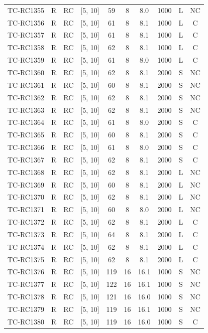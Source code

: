 \begin{longtable}{lccccccccc}
TC-RC1355 & R & RC & [5, 10] & 59 & 8 & 8.0 & 1000 & L & NC \\
TC-RC1356 & R & RC & [5, 10] & 61 & 8 & 8.1 & 1000 & L & C \\
TC-RC1357 & R & RC & [5, 10] & 61 & 8 & 8.1 & 1000 & L & C \\
TC-RC1358 & R & RC & [5, 10] & 62 & 8 & 8.1 & 1000 & L & C \\
TC-RC1359 & R & RC & [5, 10] & 61 & 8 & 8.0 & 1000 & L & C \\
TC-RC1360 & R & RC & [5, 10] & 62 & 8 & 8.1 & 2000 & S & NC \\
TC-RC1361 & R & RC & [5, 10] & 60 & 8 & 8.1 & 2000 & S & NC \\
TC-RC1362 & R & RC & [5, 10] & 62 & 8 & 8.1 & 2000 & S & NC \\
TC-RC1363 & R & RC & [5, 10] & 62 & 8 & 8.1 & 2000 & S & NC \\
TC-RC1364 & R & RC & [5, 10] & 61 & 8 & 8.0 & 2000 & S & C \\
TC-RC1365 & R & RC & [5, 10] & 60 & 8 & 8.1 & 2000 & S & C \\
TC-RC1366 & R & RC & [5, 10] & 61 & 8 & 8.0 & 2000 & S & C \\
TC-RC1367 & R & RC & [5, 10] & 62 & 8 & 8.1 & 2000 & S & C \\
TC-RC1368 & R & RC & [5, 10] & 62 & 8 & 8.1 & 2000 & L & NC \\
TC-RC1369 & R & RC & [5, 10] & 60 & 8 & 8.1 & 2000 & L & NC \\
TC-RC1370 & R & RC & [5, 10] & 62 & 8 & 8.1 & 2000 & L & NC \\
TC-RC1371 & R & RC & [5, 10] & 60 & 8 & 8.0 & 2000 & L & NC \\
TC-RC1372 & R & RC & [5, 10] & 62 & 8 & 8.1 & 2000 & L & C \\
TC-RC1373 & R & RC & [5, 10] & 64 & 8 & 8.1 & 2000 & L & C \\
TC-RC1374 & R & RC & [5, 10] & 62 & 8 & 8.1 & 2000 & L & C \\
TC-RC1375 & R & RC & [5, 10] & 62 & 8 & 8.1 & 2000 & L & C \\
TC-RC1376 & R & RC & [5, 10] & 119 & 16 & 16.1 & 1000 & S & NC \\
TC-RC1377 & R & RC & [5, 10] & 122 & 16 & 16.1 & 1000 & S & NC \\
TC-RC1378 & R & RC & [5, 10] & 121 & 16 & 16.0 & 1000 & S & NC \\
TC-RC1379 & R & RC & [5, 10] & 119 & 16 & 16.1 & 1000 & S & NC \\
TC-RC1380 & R & RC & [5, 10] & 119 & 16 & 16.0 & 1000 & S & C \\

\end{longtable}
